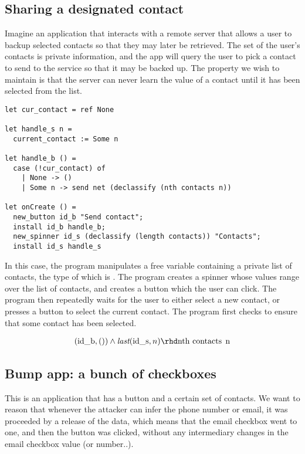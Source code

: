 \documentclass[conference]{IEEEtran}
\newcommand{\code}[1]{\text{\lstinline!#1!}}
\theoremstyle{definition}
\newcommand{\tlast}[2]{\textit{last}(#1, #2)}
\newcommand{\trelease}{\rhd}
\begin{document}
\subsection{Sharing a designated contact}
\label{example:contacts}

Imagine an application that interacts with a remote server that allows
a user to backup selected contacts so that they may later be
retrieved.  The set of the user's contacts is private information, and
the app will query the user to pick a contact to send to the service
so that it may be backed up.  The property we wish to maintain is that
the server can never learn the value of a contact until it has been
selected from the list.


\begin{lstlisting}
let cur_contact = ref None

let handle_s n =
  current_contact := Some n

let handle_b () =
  case (!cur_contact) of
    | None -> ()
    | Some n -> send net (declassify (nth contacts n))

let onCreate () = 
  new_button id_b "Send contact";
  install id_b handle_b;
  new_spinner id_s (declassify (length contacts)) "Contacts";
  install id_s handle_s
\end{lstlisting}

In this case, the program manipulates a free variable containing a
private list of contacts, the type of which is \code{list(string)}.
The program creates a spinner whose values range over the list of
contacts, and creates a button which the user can click.  The program
then repeatedly waits for the user to either select a new contact, or
presses a button to select the current contact.  The program first
checks to ensure that some contact has been selected.

\begin{displaymath}
  \begin{array}{c}
    (\code{id_b}, ()) \wedge \tlast{\code{id_s}}{n}
    \trelease
    \code{nth contacts n}
  \end{array}
\end{displaymath}

\subsection{Bump app: a bunch of checkboxes}

This is an application that has a button and a certain set of
contacts.  We want to reason that whenever the attacker can infer the
phone number or email, it was proceeded by a release of the data,
which means that the email checkbox went to one, and then the button
was clicked, without any intermediary changes in the email checkbox
value (or number..).
\end{document}
